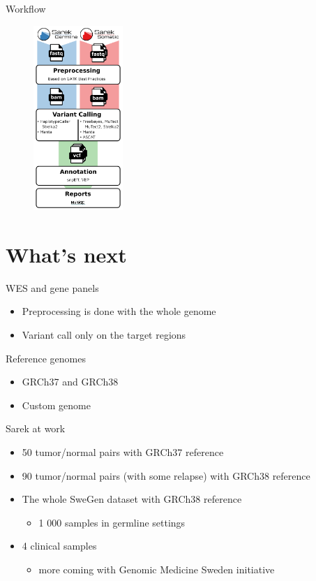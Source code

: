 \documentclass[usepdftitle=false]{beamer}
\begin{document}
\begin{frame}{Workflow}
	\begin{figure}
		\includegraphics[height=7cm]{pictures/Sarek_workflow_2}
	\end{figure}
\end{frame}

\section{What's next}

\begin{frame}{WES and gene panels}
	\begin{itemize}
		\item Preprocessing is done with the whole genome
		\pause
		\item Variant call only on the target regions
	\end{itemize}
\end{frame}

\begin{frame}{Reference genomes}
	\begin{itemize}
		\item GRCh37 and GRCh38
		\pause
		\item Custom genome
	\end{itemize}
\end{frame}

\begin{frame}{Sarek at work}
	\begin{itemize}
		\item	50 tumor/normal pairs with GRCh37 reference
		\pause
		\item	90 tumor/normal pairs (with some relapse) with GRCh38 reference
		\pause
		\item	The whole SweGen dataset with GRCh38 reference
		\begin{itemize}
			\item	1 000 samples in germline settings
		\end{itemize}
		\pause
		\item	4 clinical samples
		\begin{itemize}
			\item	more coming with Genomic Medicine Sweden initiative
		\end{itemize}
	\end{itemize}
\end{frame}
\end{document}
